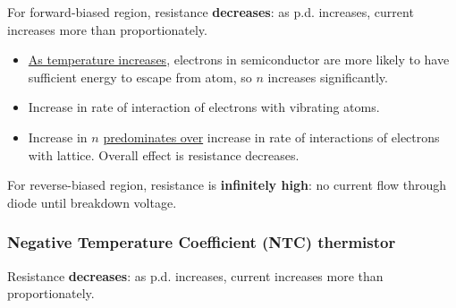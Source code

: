 \begin{figure}[H]
\centering
{}
\end{figure}

For forward-biased region, resistance \textbf{decreases}: as p.d. increases, current increases more than proportionately.

\begin{itemize}
\item \underline{As temperature increases}, electrons in semiconductor are more likely to have sufficient energy to escape from atom, so $n$ increases significantly.
\item Increase in rate of interaction of electrons with vibrating atoms.
\item Increase in $n$ \underline{predominates over} increase in rate of interactions of electrons with lattice. Overall effect is resistance decreases.
\end{itemize}

For reverse-biased region, resistance is \textbf{infinitely high}: no current flow through diode until breakdown voltage.
\pagebreak

\subsubsection{Negative Temperature Coefficient (NTC) thermistor}

\begin{figure}[H]
\centering
{}
\end{figure}

Resistance \textbf{decreases}: as p.d. increases, current increases more than proportionately.

